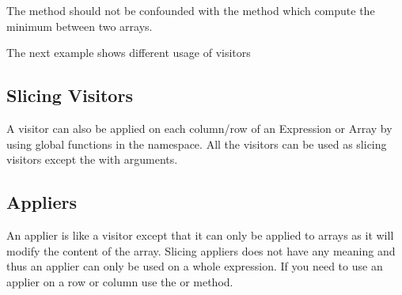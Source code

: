 \documentclass[a4paper,10pt]{article}
\begin{document}
The  method should not be confounded with the  method which compute
the minimum between two arrays.

The next example shows different usage of visitors

\begin{minipage}[t]{0.66\textwidth}

\end{minipage}
\hspace{0.2cm}
\begin{minipage}[t]{0.33\textwidth}
\addtocounter{lstlisting}{-1}

\end{minipage}

\subsection{Slicing Visitors}

A visitor can also be applied on each column/row of an Expression
or Array by using global functions in the  namespace. All the visitors
can be used as slicing visitors except the  with arguments.

\begin{minipage}[t]{0.6\textwidth}

\end{minipage}
\hspace{0.2cm}
\begin{minipage}[t]{0.39\textwidth}
\addtocounter{lstlisting}{-1}

\end{minipage}

\subsection{Appliers}

An applier is like a visitor except that it can only be applied to arrays
as it will modify the content of the array. Slicing appliers does not have
any meaning and thus an applier can only be used on a whole expression. If
you need to use an applier on a row or column use the  or  method.

\begin{minipage}[t]{0.5\textwidth}

\end{minipage}
\hspace{0.2cm}
\begin{minipage}[t]{0.5\textwidth}
\addtocounter{lstlisting}{-1}

\end{minipage}
\end{document}
